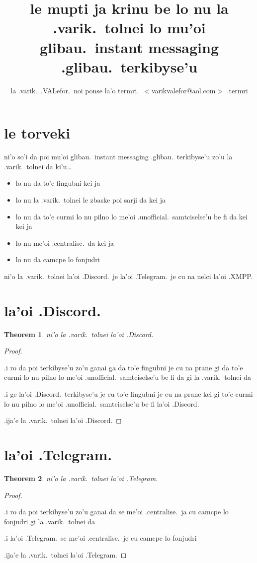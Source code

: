 \documentclass{article}
\title{le mupti ja krinu be lo nu la .varik.\ tolnei lo mu'oi glibau.\ instant messaging .glibau.\ terkibyse'u}
\author{la .varik.\ .VALefor.\ noi ponse la'o termri.\ $<$varikvalefor@aol.com$>$ .termri}
\newtheorem{thm}{Theorem}
\begin{document}
\maketitle

\section{le torveki}
ni'o so'i da poi mu'oi glibau.\ instant messaging .glibau.\ terkibyse'u zo'u la .varik.\ tolnei da ki'u\ldots
\begin{itemize}
	\item lo nu da to'e fingubni kei ja
	\item lo nu la .varik.\ tolnei le zbaske poi sarji da kei ja
	\item lo nu da to'e curmi lo nu pilno lo me'oi .unofficial.\ samtciselse'u be fi da kei kei ja
	\item lo nu me'oi .centralise.\ da kei ja
	\item lo nu da camcpe lo fonjudri
\end{itemize}

ni'o la .varik.\ tolnei la'oi .Discord.\ je la'oi .Telegram.\ je cu na nelci la'oi .XMPP.
\section{la'oi .Discord.}
\begin{thm}
	ni'o la .varik.\ tolnei la'oi .Discord.
\end{thm}
\begin{proof}
	${}$

	.i ro da poi terkibyse'u zo'u ganai ga da to'e fingubni je cu na prane gi da to'e curmi lo nu pilno lo me'oi .unofficial.\ samtciselse'u be fi da gi la .varik.\ tolnei da

	.i ge la'oi .Discord.\ terkibyse'u je cu to'e fingubni je cu na prane kei gi to'e curmi lo nu pilno lo me'oi .unofficial.\ samtciselse'u be fi la'oi .Discord.

	.ija'e la .varik.\ tolnei la'oi .Discord.
\end{proof}

\section{la'oi .Telegram.}
\begin{thm}
	ni'o la .varik.\ tolnei la'oi .Telegram.
\end{thm}
\begin{proof}
	${}$

	.i ro da poi terkibyse'u zo'u ganai da se me'oi .centralise.\ ja cu camcpe lo fonjudri gi la .varik.\ tolnei da

	.i la'oi .Telegram.\ se me'oi .centralise.\ je cu camcpe lo fonjudri

	.ija'e la .varik.\ tolnei la'oi .Telegram.
\end{proof}
\end{document}
